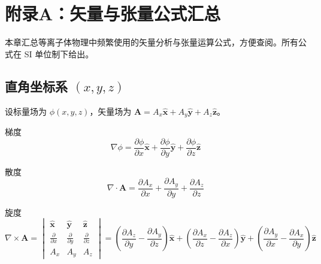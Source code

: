 \documentclass[12pt,a4paper,openany,oneside]{book}
\newcommand{\vect}[1]{\bm{#1}}
\newcommand{\unitvec}[1]{\hat{\vect{#1}}}
\newcommand{\grad}{\nabla}
\newcommand{\curl}{\nabla\times}
\newcommand{\divg}{\nabla\cdot}
\begin{document}
\appendix

\chapter*{附录A：矢量与张量公式汇总}

本章汇总等离子体物理中频繁使用的矢量分析与张量运算公式，方便查阅。所有公式在 SI 单位制下给出。

\section{直角坐标系 $(x,y,z)$}

设标量场为 $\phi(x,y,z)$，矢量场为 $\vect{A}=A_x\unitvec{x}+A_y\unitvec{y}+A_z\unitvec{z}$。

\begin{definition}{梯度}{}{}
\begin{equation}
\grad\phi = \frac{\partial \phi}{\partial x}\unitvec{x} + \frac{\partial \phi}{\partial y}\unitvec{y} + \frac{\partial \phi}{\partial z}\unitvec{z}
\end{equation}
\end{definition}

\begin{definition}{散度}{}{}
\begin{equation}
\divg\vect{A} = \frac{\partial A_x}{\partial x} + \frac{\partial A_y}{\partial y} + \frac{\partial A_z}{\partial z}
\end{equation}
\end{definition}

\begin{definition}{旋度}{}{}
\begin{equation}
\curl\vect{A} =
\begin{vmatrix}
\unitvec{x} & \unitvec{y} & \unitvec{z} \\[4pt]
\frac{\partial }{\partial x} & \frac{\partial }{\partial y} & \frac{\partial }{\partial z} \\[4pt]
A_x & A_y & A_z
\end{vmatrix}
= \left(\frac{\partial A_z}{\partial y}-\frac{\partial A_y}{\partial z}\right)\unitvec{x}
+ \left(\frac{\partial A_x}{\partial z}-\frac{\partial A_z}{\partial x}\right)\unitvec{y}
+ \left(\frac{\partial A_y}{\partial x}-\frac{\partial A_x}{\partial y}\right)\unitvec{z}
\end{equation}
\end{definition}
\end{document}
